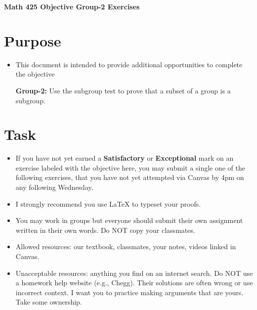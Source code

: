 \documentclass[12pt]{article}
\begin{document}
	\begin{center}
		{\Large \bf Math 425 Objective Group-2 Exercises}
	\end{center}
	\section*{Purpose}
	\begin{itemize}
		\item This document is intended to provide additional opportunities to complete the objective
		
		\textbf{Group-2:} Use the subgroup test to prove that a subset of a group is a subgroup.
	\end{itemize}
	\section*{Task}
	\begin{itemize}
		\item If you have not yet earned a \textbf{Satisfactory} or \textbf{Exceptional} mark on an exercise labeled with the objective here, you may submit a single one of the following exercises, that you have not yet attempted via Canvas by 4pm on any following Wednesday.
		\item I strongly recommend you use LaTeX to typeset your proofs.
		\item You may work in groups but everyone should submit their own assignment written in their own words.  Do NOT copy your classmates.
		\item Allowed resources: our textbook, classmates, your notes, videos linked in Canvas.
		\item Unacceptable resources: anything you find on an internet search. Do NOT use a homework help website (e.g., Chegg). Their solutions are often wrong or use incorrect context.  I want you to practice making arguments that are yours. Take some ownership.
	\end{itemize}
\end{document}

